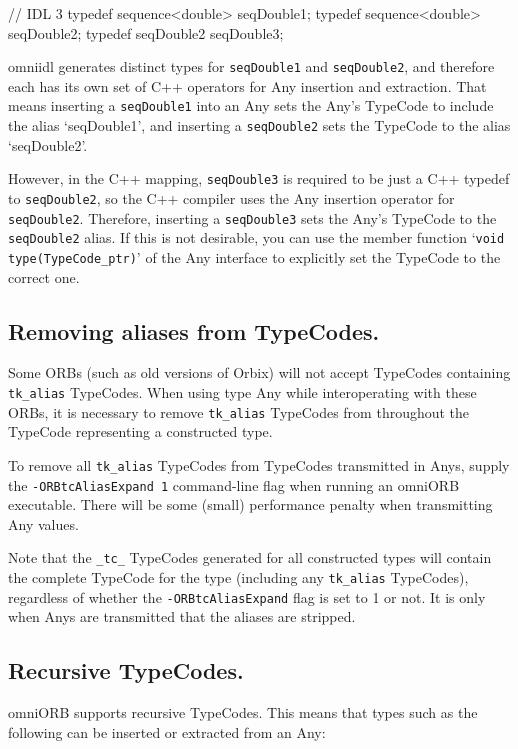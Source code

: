 \documentclass[11pt,twoside,a4paper]{book}
\newcommand{\type}[1]{\texttt{#1}}
\newcommand{\code}[1]{\texttt{#1}}
\begin{document}
\begin{idllisting}
// IDL 3
typedef sequence<double> seqDouble1;
typedef sequence<double> seqDouble2;
typedef seqDouble2       seqDouble3;
\end{idllisting}

omniidl generates distinct types for \type{seqDouble1} and
\type{seqDouble2}, and therefore each has its own set of C++ operators
for Any insertion and extraction. That means inserting a
\type{seqDouble1} into an Any sets the Any's TypeCode to include the
alias `seqDouble1', and inserting a \type{seqDouble2} sets the
TypeCode to the alias `seqDouble2'.

However, in the C++ mapping, \type{seqDouble3} is required to be just
a C++ typedef to \type{seqDouble2}, so the C++ compiler uses the Any
insertion operator for \type{seqDouble2}. Therefore, inserting a
\type{seqDouble3} sets the Any's TypeCode to the \type{seqDouble2}
alias. If this is not desirable, you can use the member function
`\code{void type(TypeCode\_ptr)}' of the Any interface to explicitly
set the TypeCode to the correct one.


\subsection{Removing aliases from TypeCodes.}
Some ORBs (such as old versions of Orbix) will not accept TypeCodes
containing \code{tk\_alias} TypeCodes. When using type Any while
interoperating with these ORBs, it is necessary to remove
\code{tk\_alias} TypeCodes from throughout the TypeCode representing a
constructed type.

To remove all \code{tk\_alias} TypeCodes from TypeCodes transmitted in
Anys, supply the \texttt{-ORBtcAliasExpand 1} command-line flag when
running an omniORB executable. There will be some (small) performance
penalty when transmitting Any values.

Note that the \code{\_tc\_} TypeCodes generated for all constructed
types will contain the complete TypeCode for the type (including any
\code{tk\_alias} TypeCodes), regardless of whether the
\texttt{-ORBtcAliasExpand} flag is set to 1 or not. It is only when
Anys are transmitted that the aliases are stripped.

\subsection{Recursive TypeCodes.}
omniORB supports recursive TypeCodes. This means that types such as
the following can be inserted or extracted from an Any:
\end{document}
